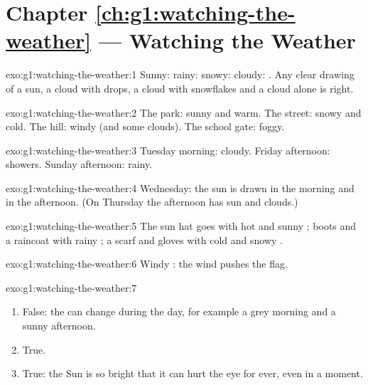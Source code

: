 \section*{Chapter \ref{ch:g1:watching-the-weather} --- Watching the Weather}

\begin{solution}{exo:g1:watching-the-weather:1}
Sunny: \quad rainy: \quad snowy: \quad
cloudy: . Any clear drawing of a sun, a cloud with drops, a
cloud with snowflakes and a cloud alone is right.
\end{solution}

\begin{solution}{exo:g1:watching-the-weather:2}
The park: sunny and warm. The street: snowy and cold. The hill: windy (and
some clouds). The school gate: foggy.
\end{solution}

\begin{solution}{exo:g1:watching-the-weather:3}
Tuesday morning: cloudy. Friday afternoon: showers. Sunday afternoon:
rainy.
\end{solution}

\begin{solution}{exo:g1:watching-the-weather:4}
Wednesday: the sun is drawn in the morning and in the afternoon.
(On Thursday the afternoon has sun and clouds.)
\end{solution}

\begin{solution}{exo:g1:watching-the-weather:5}
The sun hat goes with hot and sunny ; boots and a raincoat with
rainy ; a scarf and gloves with cold and snowy .
\end{solution}

\begin{solution}{exo:g1:watching-the-weather:6}
Windy : the wind pushes the flag.
\end{solution}

\begin{solution}{exo:g1:watching-the-weather:7}
\begin{enumerate}
  \item False: the  can change during the day, for example a grey
        morning and a sunny afternoon.
  \item True.
  \item True: the Sun is so bright that it can hurt the eye for ever,
        even in a moment.
\end{enumerate}
\end{solution}

